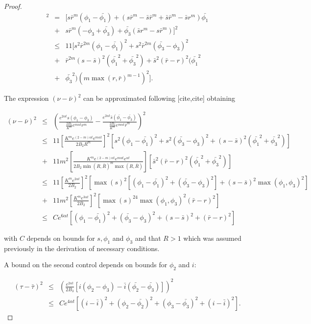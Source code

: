 \begin{proof}
\begin{eqnarray*}
	[s\bar{r}^m(\phi_1-\phi_3)-\bar{s}r^m(\bar{\phi_1}-\bar{\phi_3})]^2&=&[s\bar{r}^m(\phi_1-\bar{\phi_1})+(s\bar{r}^m-\bar{s}\bar{r}^m+\bar{s}\bar{r}^m-\bar{s}r^m)\bar{\phi_1}\\
	&+&s\bar{r}^m(-\phi_3+\bar{\phi_3})+\bar{\phi_3}(\bar{s}r^m-s\bar{r}^m)]^2\\
	&\leq&11[s^2\bar{r}^{2m}(\phi_1-\bar{\phi_1})^2+s^2\bar{r}^{2m}(\bar{\phi_3}-\phi_3)^2\\
	&+&\bar{r}^{2m}(s-\bar{s})^2(\bar{\phi_1}^2+\bar{\phi_3}^2)+\bar{s}^2(\bar{r}-r)^2(\bar{\phi_1}^2\\
	&+&\bar{\phi_3}^2)(m \max(r,\bar{r})^{m-1})^2].
\end{eqnarray*}	
	
The expression $(\nu-\bar{\nu})^2$ can be approximated following [cite,cite] obtaining

\begin{eqnarray}
	(\nu-\bar{\nu})^2&\leq&\left(\frac{e^{2\alpha t}s(\phi_1-\phi_3)}{\frac{2B_2}{K^m}e^{m\alpha t}r^m}-\frac{e^{2\alpha t}\bar{s}(\bar{\phi_1}-\bar{\phi_3})}{\frac{2B_2}{K^m}e^{m\alpha t}\bar{r}^m}\right)^2\nonumber\\
	&\leq& 11\left[\frac{K^me^{(2-m)\alpha t}e^{m\alpha t}}{2B_2R^m}\right]^2[s^2(\phi_1-\bar{\phi_1})^2+s^2(\bar{\phi_3}-\phi_3)^2+(s-\bar{s})^2(\bar{\phi_1}^2+\bar{\phi_3}^2)]\nonumber\\
	&+&11m^2\left[\frac{K^me^{(2-m)\alpha t}e^{m\alpha t}e^{\alpha t}}{2B_2\min(R,\bar{R})^m\max(R,\bar{R})}\right][\bar{s}^2(\bar{r}-r)^2(\bar{\phi_1}^2+\bar{\phi_3}^2)]\nonumber\\
	&\leq&11\left[\frac{K^me^{2\alpha t}}{2B_2}\right]^2[\max(s)^2[(\phi_1-\bar{\phi_1})^2+(\bar{\phi_3}-\phi_3)^2]+(s-\bar{s})^2\max(\phi_1,\phi_3)^2]\nonumber\\
	&+& 11m^2\left[\frac{K^me^{3\alpha t}}{2B_2}\right]^2[\max(s)^24\max(\phi_1,\phi_3)^2(\bar{r}-r)^2]\nonumber\\
	&\leq& Ce^{6\alpha t}[(\phi_1-\bar{\phi_1})^2+(\bar{\phi_3}-\phi_3)^2+(s-\bar{s})^2+(\bar{r}-r)^2]\label{eq.1.4.46}
\end{eqnarray}

with $C$ depends on bounds for $s,\phi_1$ and $\phi_3$ and that $R>1$ which was assumed previously in the derivation of necessary conditions.

A bound on the second control depends on bounds for $\phi_2$ and $i$:

\begin{eqnarray}
(\tau-\bar{\tau})^2&\leq&\left(\frac{e^{2\alpha t}}{2B_3}[i(\phi_2-\phi_3)-\bar{i}(\bar{\phi_2}-\bar{\phi_3})]\right)^2\nonumber\\
&\leq& Ce^{4\alpha t}[(i-\bar{i})^2+(\phi_2-\bar{\phi_2})^2+(\phi_3-\bar{\phi_3})^2+(i-\bar{i})^2].\label{eq.1.4.47}
\end{eqnarray}


\end{proof}
